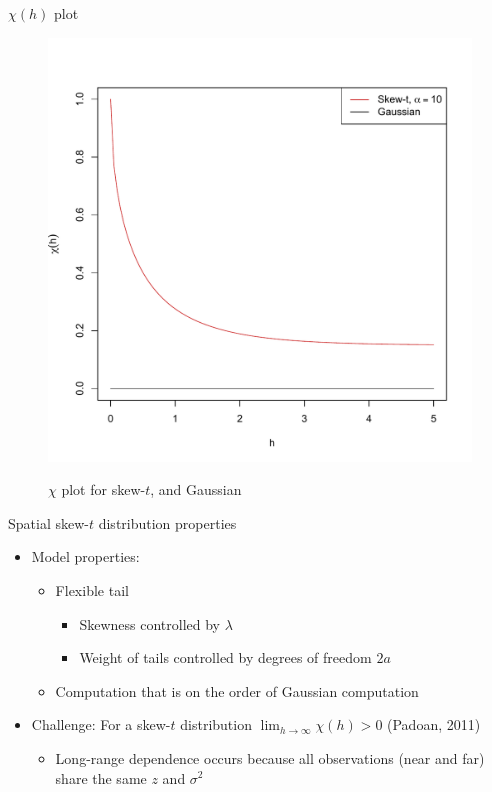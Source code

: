 \documentclass{beamer}
\begin{document}
\begin{frame}{$\chi(h)$ plot}
  \vspace{-2em}
  \centering
  \begin{figure}
  \includegraphics[width=.65\linewidth]{./plots/pot/chi-h-t_and_gaus.pdf}\\[-0.2in]
  \caption{$\chi$ plot for skew-$t$, and Gaussian}
  \end{figure}
\end{frame}

\begin{frame}{Spatial skew-$t$ distribution properties}
  \begin{itemize} \setlength{\itemsep}{1em}
    \item Model properties: \vspace{0.5em}
    \begin{itemize} \setlength{\itemsep}{0.5em}
      \item Flexible tail
      \begin{itemize}
        \item Skewness controlled by $\lambda$
        \item Weight of tails controlled by degrees of freedom $2a$
      \end{itemize}
      \item Computation that is on the order of Gaussian computation
    \end{itemize}
    \item Challenge: For a skew-$t$ distribution $\lim_{h \rightarrow \infty} \chi(h) > 0$ (Padoan, 2011) \vspace{-1em}
    \begin{itemize}
      \item Long-range dependence occurs because all observations (near and far) share the same $z$ and $\sigma^2$
    \end{itemize}
  \end{itemize}
\end{frame}
\end{document}
